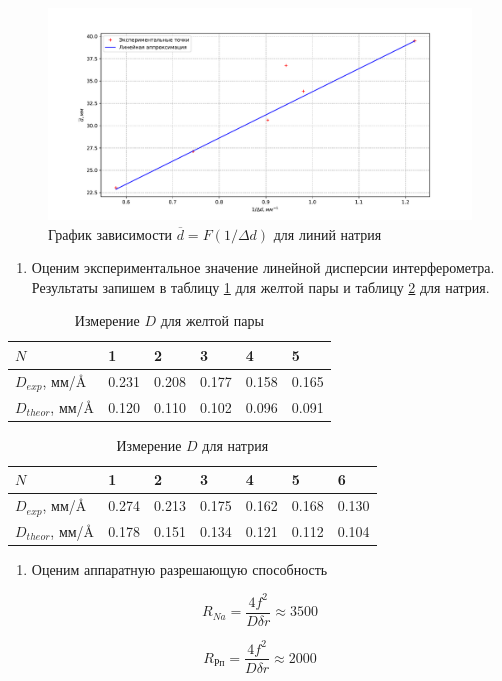 \documentclass[a4paper,12pt]{article}
\begin{document}
\FloatBarrier
\begin{figure}[!h]
    \centering
    \includegraphics[scale=0.65]{graph_na_2.pdf}
    \caption{График зависимости $\overline{d} = F(1/\Delta d)$ для линий натрия}
    \label{graph:4}
\end{figure}
\FloatBarrier

\clearpage

\begin{enumerate}[resume]
    \item Оценим экспериментальное значение линейной дисперсии интерферометра. Результаты запишем в таблицу \ref{table:6} для желтой пары и таблицу \ref{table:7} для натрия.
\end{enumerate}

\FloatBarrier
\begin{table}[!ht]
    \centering
    \caption{Измерение $D$ для желтой пары}
    \begin{tabular}{|l|l|l|l|l|l|}
        \hline
        $N$ & 1     & 2     & 3     & 4     & 5     \\ \hline
        $D_{exp}$, мм/\si{\angstrom}     & 0.231 & 0.208 & 0.177 & 0.158 & 0.165 \\ \hline
        $D_{theor}$, мм/\si{\angstrom}   & 0.120 & 0.110 & 0.102 & 0.096 & 0.091 \\ \hline
    \end{tabular}
    \label{table:6}
\end{table}
\FloatBarrier


\FloatBarrier
\begin{table}[!ht]
    \centering
    \caption{Измерение $D$ для натрия}
    \begin{tabular}{|l|l|l|l|l|l|l|}
        \hline
        $N$ & 1     & 2     & 3     & 4     & 5  & 6   \\ \hline
        $D_{exp}$, мм/\si{\angstrom}     & 0.274 & 0.213 & 0.175 & 0.162 & 0.168 & 0.130 \\ \hline
        $D_{theor}$, мм/\si{\angstrom}   & 0.178 & 0.151 & 0.134 & 0.121 & 0.112 & 0.104 \\ \hline
    \end{tabular}
    \label{table:7}
\end{table}
\FloatBarrier


\begin{enumerate}[resume]
    \item Оценим аппаратную разрешающую способность 
\end{enumerate}

\begin{equation*}
    R_{Na} = \frac{4 f^2}{D \delta r} \approx 3500
\end{equation*}

\begin{equation*}
    R_{Рп} = \frac{4 f^2}{D \delta r} \approx 2000
\end{equation*}
\end{document}
